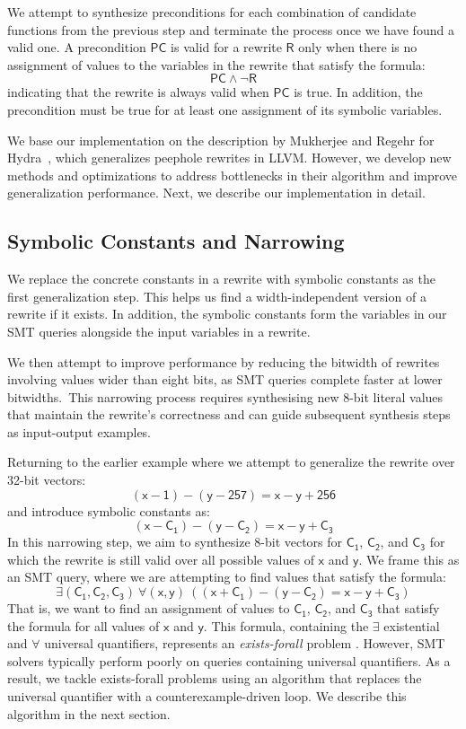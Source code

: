 \documentclass[review, anonymous, acmsmall]{acmart}
\newcommand{\blockmath}[1]{\[\mathsf{#1}\]}
\newcommand{\inline}[1]{$\mathsf{#1}$}
\begin{document}
\begin{itemize}
    We attempt to synthesize preconditions for each combination of candidate functions from the previous step and terminate the process once we have found a valid one. A precondition \inline{PC} is valid for a rewrite \inline{R} only when there is no assignment of values to the variables in the rewrite that satisfy the formula:
    \blockmath{PC \land \neg R}
    indicating that the rewrite is always valid when \inline{PC} is true. In addition, the precondition must be true for at least one assignment of its symbolic variables.
\end{itemize}

We base our implementation on the description by Mukherjee and Regehr for Hydra~\cite{mukherjee_hydra_2024}, which generalizes peephole rewrites in LLVM. However, we develop new methods and optimizations to address bottlenecks in their algorithm and improve generalization performance. Next, we describe our implementation in detail. 

\subsection{Symbolic Constants and Narrowing}
We replace the concrete constants in a rewrite with symbolic constants as the first generalization step. This helps us find a width-independent version of a rewrite if it exists. In addition, the symbolic constants form the variables in our SMT queries alongside the input variables in a rewrite. 

We then attempt to improve performance by reducing the bitwidth of rewrites involving values wider than eight bits, as SMT queries complete faster at lower bitwidths.\ This narrowing process requires synthesising new 8-bit literal values that maintain the rewrite's correctness and can guide subsequent synthesis steps as input-output examples. 

Returning to the earlier example where we attempt to generalize the rewrite over 32-bit vectors:
\blockmath{(x - 1) - (y - 257) = x - y + 256}
and introduce symbolic constants as:
\blockmath{(x - C_1) - (y - C_2) = x - y + C_3}
In this narrowing step, we aim to synthesize 8-bit vectors for \inline{C_1}, \inline{C_2}, and \inline{C_3} for which the rewrite is still valid over all possible values of \inline{x} and \inline{y}. We frame this as an SMT query, where we are attempting to find values that satisfy the formula:
   \blockmath{\exists (C_1, C_2, C_3)\ \forall (x, y)\ ((x + C_1)  - (y - C_2) = x - y + C_3)}
That is, we want to find an assignment of values to \inline{C_1}, \inline{C_2}, and \inline{C_3} that satisfy the formula for all values of \inline{x} and \inline{y}. 
This formula, containing the \inline{\exists}  existential and \inline{\forall} universal quantifiers, represents an \textit{exists-forall} problem \cite{dutertre_solving_2015}. However, SMT solvers typically perform poorly on queries containing universal quantifiers. As a result, we tackle exists-forall problems using an algorithm that replaces the universal quantifier with a counterexample-driven loop. We describe this algorithm in the next section. 
\end{document}
